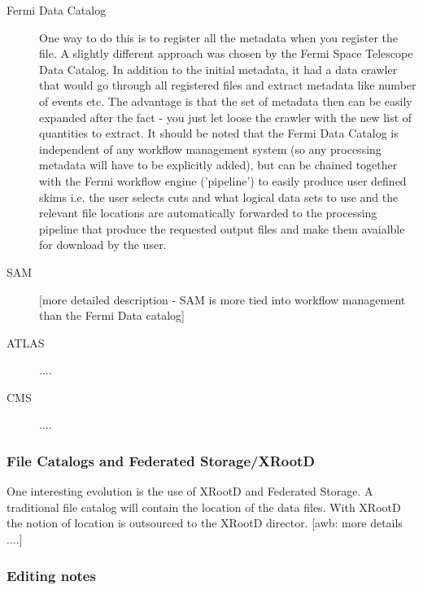 \begin{description}
\item[Fermi Data Catalog] One way to do this is to register all the metadata when you register the file. A slightly
different approach was chosen by the Fermi Space Telescope Data Catalog. In addition to the initial metadata, it had a
data crawler that would go through all registered files and extract metadata like number of events etc. The advantage is
that the set of metadata then can be easily expanded after the fact - you just let loose the crawler with the new list
of quantities to extract. It should be noted that the Fermi Data Catalog is independent of any workflow 
management system (so any processing metadata will have to be explicitly added), but can be chained together with 
the Fermi workflow engine ('pipeline') to easily produce user defined skims i.e. the user selects cuts and what 
logical data sets to use and the relevant file locations are automatically forwarded to the processing pipeline that 
produce the requested output files and make them avaialble for download by the user.

\item[SAM] [more detailed description - SAM is more tied into workflow management than the Fermi Data catalog]

\item[ATLAS] ....

\item[CMS] ....

\end{description}


\subsubsection{File Catalogs and Federated Storage/XRootD}
One interesting evolution is the use of XRootD and Federated Storage. A traditional file catalog will contain the 
location of the data files. With XRootD the notion of location is outsourced to the XRootD director. 
[awb: more details ....]





\subsubsection{Editing notes}


